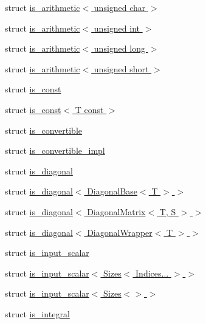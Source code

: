 \begin{DoxyCompactItemize}
\item 
struct \hyperlink{struct_eigen_1_1internal_1_1is__arithmetic_3_01unsigned_01char_01_4}{is\+\_\+arithmetic$<$ unsigned char $>$}
\item 
struct \hyperlink{struct_eigen_1_1internal_1_1is__arithmetic_3_01unsigned_01int_01_4}{is\+\_\+arithmetic$<$ unsigned int $>$}
\item 
struct \hyperlink{struct_eigen_1_1internal_1_1is__arithmetic_3_01unsigned_01long_01_4}{is\+\_\+arithmetic$<$ unsigned long $>$}
\item 
struct \hyperlink{struct_eigen_1_1internal_1_1is__arithmetic_3_01unsigned_01short_01_4}{is\+\_\+arithmetic$<$ unsigned short $>$}
\item 
struct \hyperlink{struct_eigen_1_1internal_1_1is__const}{is\+\_\+const}
\item 
struct \hyperlink{struct_eigen_1_1internal_1_1is__const_3_01_t_01const_01_4}{is\+\_\+const$<$ T const $>$}
\item 
struct \hyperlink{struct_eigen_1_1internal_1_1is__convertible}{is\+\_\+convertible}
\item 
struct \hyperlink{struct_eigen_1_1internal_1_1is__convertible__impl}{is\+\_\+convertible\+\_\+impl}
\item 
struct \hyperlink{struct_eigen_1_1internal_1_1is__diagonal}{is\+\_\+diagonal}
\item 
struct \hyperlink{struct_eigen_1_1internal_1_1is__diagonal_3_01_diagonal_base_3_01_t_01_4_01_4}{is\+\_\+diagonal$<$ Diagonal\+Base$<$ T $>$ $>$}
\item 
struct \hyperlink{struct_eigen_1_1internal_1_1is__diagonal_3_01_diagonal_matrix_3_01_t_00_01_s_01_4_01_4}{is\+\_\+diagonal$<$ Diagonal\+Matrix$<$ T, S $>$ $>$}
\item 
struct \hyperlink{struct_eigen_1_1internal_1_1is__diagonal_3_01_diagonal_wrapper_3_01_t_01_4_01_4}{is\+\_\+diagonal$<$ Diagonal\+Wrapper$<$ T $>$ $>$}
\item 
struct \hyperlink{struct_eigen_1_1internal_1_1is__input__scalar}{is\+\_\+input\+\_\+scalar}
\item 
struct \hyperlink{struct_eigen_1_1internal_1_1is__input__scalar_3_01_sizes_3_01_indices_8_8_8_01_4_01_4}{is\+\_\+input\+\_\+scalar$<$ Sizes$<$ Indices... $>$ $>$}
\item 
struct \hyperlink{struct_eigen_1_1internal_1_1is__input__scalar_3_01_sizes_3_4_01_4}{is\+\_\+input\+\_\+scalar$<$ Sizes$<$$>$ $>$}
\item 
struct \hyperlink{struct_eigen_1_1internal_1_1is__integral}{is\+\_\+integral}

\end{DoxyCompactItemize}
